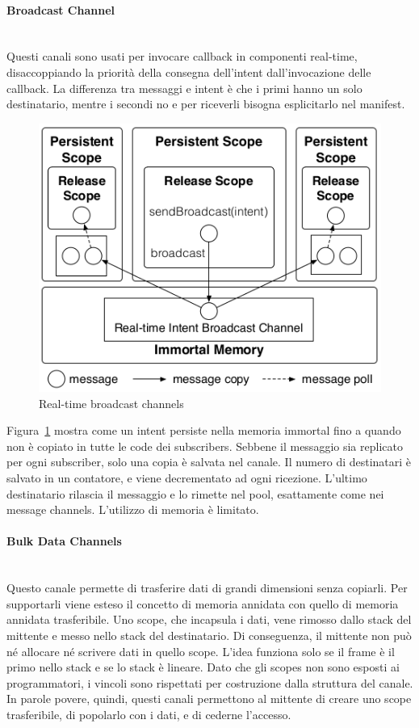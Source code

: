 \paragraph{Broadcast Channel} \mbox{} \\
Questi canali sono usati per invocare callback in componenti real-time, disaccoppiando la priorità della consegna dell'intent dall'invocazione delle callback. La differenza tra messaggi e intent è che i primi hanno un solo destinatario, mentre i secondi no e per riceverli bisogna esplicitarlo nel manifest. 

\begin{figure}[h]
	\centering
	\includegraphics[width=0.6\linewidth]{images/broadcastChannel}
	\caption{Real-time broadcast channels}
	\label{fig:broadcastchannel}
\end{figure}

Figura~\ref{fig:broadcastchannel} mostra come un intent persiste nella memoria immortal fino a quando non è copiato in tutte le code dei subscribers. Sebbene il messaggio sia replicato per ogni subscriber, solo una copia è salvata nel canale. Il numero di destinatari è salvato in un contatore, e viene decrementato ad ogni ricezione. L'ultimo destinatario rilascia il messaggio e lo rimette nel pool, esattamente come nei message channels. L'utilizzo di memoria è limitato.

\paragraph{Bulk Data Channels} \mbox{} \\
Questo canale permette di trasferire dati di grandi dimensioni senza copiarli. Per supportarli viene esteso il concetto di memoria annidata con quello di memoria annidata trasferibile. Uno scope, che incapsula i dati, vene rimosso dallo stack del mittente e messo nello stack del destinatario. Di conseguenza, il mittente non può né allocare né scrivere dati in quello scope. L'idea funziona solo se il frame è il primo nello stack e se lo stack è lineare. Dato che gli scopes non sono esposti ai programmatori, i vincoli sono rispettati per costruzione dalla struttura del canale. In parole povere, quindi, questi canali permettono al mittente di creare uno scope trasferibile, di popolarlo con i dati, e di cederne l'accesso.

